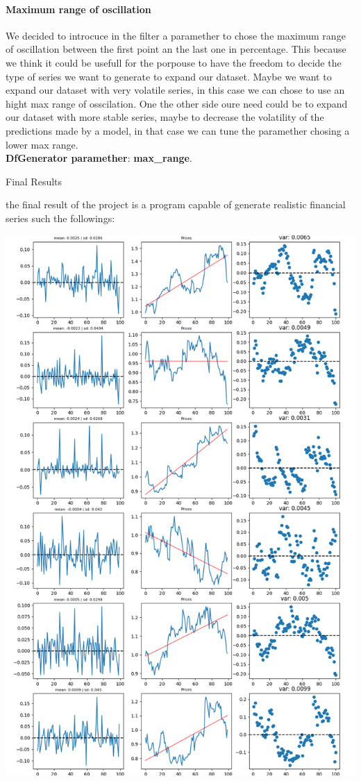 \documentclass{article}
\begin{document}
\begin{multicols}{2}
    \paragraph*{Maximum range of oscillation}
    We decided to introcuce in the filter a paramether to chose the maximum range of oscillation between the first point an the last one in percentage. This because we think it could be usefull for the porpouse to have the freedom to decide the type of series we want 
    to generate to expand our dataset. Maybe we want to expand our dataset with very volatile series, in this case we can chose to use an hight max range of osscilation. One the other side oure need could be to expand our dataset with more stable series, maybe to decrease 
    the volatility of the predictions made by a model, in that case we can tune the paramether chosing a lower max range.\\
    \textbf{DfGenerator paramether}:  \textbf{max\_range}.

    \end{multicols}
    \newpage
    \begin{center}
        {\huge{Final Results}}
    \end{center} 
    the final result of the project is a program capable of generate realistic financial series such the followings:
    \begin{center}
        \includegraphics[scale=0.5]{imgs/results_reduced.png}
    \end{center}
\end{document}
